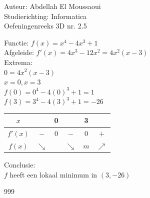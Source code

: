 \documentclass[a4paper]{article}
\begin{document}
  
\noindent \large Auteur: Abdellah El Moussaoui \\
\noindent \large Studierichting: Informatica\\
\noindent \large Oefeningenreeks 3D nr. 2.5\\

\medskip

\normalsize


Functie: $f(x) = x^4 - 4x^3 + 1$ \\

Afgeleide: $f'(x) = 4x^3 - 12x^2 = 4x^2 \left( x - 3\right)$ \\

Extrema: \\

$0 = 4x^2 \left( x - 3\right)$ \\

$x = 0, x= 3$ \\

$f(0) = 0^4 - 4\left (0 \right)^3 + 1 = 1$ \\

$f(3) = 3^4 - 4\left (3 \right)^3 + 1 = -26$ \\



\begin{tabular}{c|ccccc}
        $x$     &  & 0 & & 3 &  \\         \hline
        $f'(x)$ &  $-$ & $0$ & $-$ & $0$  &  $+$  \\         \hline
        $f(x)$  & $\searrow$  &  &$\searrow$ & $m$& $\nearrow$\\
\end{tabular}

Conclusie: \\

$f$ heeft een lokaal minimum in $(3, -26)$


  
    

\begin{thebibliography}{999}
\end{thebibliography}
\end{document}
